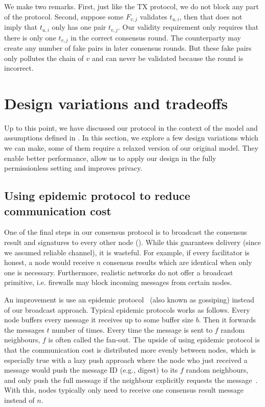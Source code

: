 We make two remarks.
First, just like the TX protocol, we do not block any part of the protocol.
Second, suppose some $F_{v, j}$ validates $t_{u, i}$, then that does not imply that $t_{u, i}$ only has one pair $t_{v, j}$.
Our validity requirement only requires that there is only one $t_{v, j}$ in the correct consensus round.
The counterparty may create any number of fake pairs in later consensus rounds.
But these fake pairs only pollutes the chain of $v$ and can never be validated because the round is incorrect.

\section{Design variations and tradeoffs}
\label{sec:tradeoffs}

Up to this point,
we have discussed our protocol in the context of the model and assumptions defined in .
In this section, 
we explore a few design variations which we can make, some of them require a relaxed version of our original model.
They enable better performance, allow us to apply our design in the fully permissionless setting and improves privacy.

\subsection{Using epidemic protocol to reduce communication cost}
One of the final steps in our consensus protocol is to broadcast the consensus result and signatures to every other node ().
While this guarantees delivery (since we assumed reliable channel), it is wasteful.
For example, if every facilitator is honest, a node would receive $n$ consensus results which are identical when only one is necessary.
Furthermore, realistic networks do not offer a broadcast primitive,
i.e. firewalls may block incoming messages from certain nodes.

An improvement is use an epidemic protocol~\cite{eugster2004epidemic} (also known as gossiping) instead of our broadcast approach.
Typical epidemic protocols works as follows.
Every node buffers every message it receives up to some buffer size $b$.
Then it forwards the messages $t$ number of times.
Every time the message is sent to $f$ random neighbours, $f$ is often called the fan-out.
The upside of using epidemic protocol is that the communication cost is distributed more evenly between nodes,
which is especially true with a lazy push approach where the node who just received a message would push the message ID (e.g., digest) to its $f$ random neighbours,
and only push the full message if the neighbour explicitly requests the message~\cite{leitao2007epidemic}.
With this, nodes typically only need to receive one consensus result message instead of $n$.


